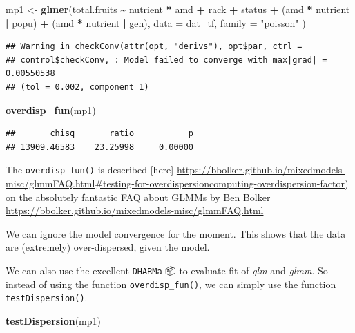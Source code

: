 \documentclass[
  12pt,
]{book}
\newenvironment{Shaded}{\begin{snugshade}}{\end{snugshade}}
\newcommand{\DataTypeTok}[1]{\textcolor[rgb]{0.13,0.29,0.53}{#1}}
\newcommand{\KeywordTok}[1]{\textcolor[rgb]{0.13,0.29,0.53}{\textbf{#1}}}
\newcommand{\NormalTok}[1]{#1}
\newcommand{\OperatorTok}[1]{\textcolor[rgb]{0.81,0.36,0.00}{\textbf{#1}}}
\newcommand{\StringTok}[1]{\textcolor[rgb]{0.31,0.60,0.02}{#1}}
\begin{document}
\begin{Shaded}
\begin{Highlighting}[]
\NormalTok{mp1 \textless{}{-}}\StringTok{ }\KeywordTok{glmer}\NormalTok{(total.fruits }\OperatorTok{\textasciitilde{}}\StringTok{ }\NormalTok{nutrient }\OperatorTok{*}\StringTok{ }\NormalTok{amd }\OperatorTok{+}
\StringTok{  }\NormalTok{rack }\OperatorTok{+}\StringTok{ }\NormalTok{status }\OperatorTok{+}
\StringTok{  }\NormalTok{(amd }\OperatorTok{*}\StringTok{ }\NormalTok{nutrient }\OperatorTok{|}\StringTok{ }\NormalTok{popu) }\OperatorTok{+}
\StringTok{  }\NormalTok{(amd }\OperatorTok{*}\StringTok{ }\NormalTok{nutrient }\OperatorTok{|}\StringTok{ }\NormalTok{gen),}
\DataTypeTok{data =}\NormalTok{ dat\_tf, }\DataTypeTok{family =} \StringTok{"poisson"}
\NormalTok{)}
\end{Highlighting}
\end{Shaded}

\begin{verbatim}
## Warning in checkConv(attr(opt, "derivs"), opt$par, ctrl =
## control$checkConv, : Model failed to converge with max|grad| = 0.00550538
## (tol = 0.002, component 1)
\end{verbatim}

\begin{Shaded}
\begin{Highlighting}[]
\KeywordTok{overdisp\_fun}\NormalTok{(mp1)}
\end{Highlighting}
\end{Shaded}

\begin{verbatim}
##       chisq       ratio           p 
## 13909.46583    23.25998     0.00000
\end{verbatim}

The \texttt{overdisp\_fun()} is described {[}here{]} \url{https://bbolker.github.io/mixedmodels-misc/glmmFAQ.html\#testing-for-overdispersioncomputing-overdispersion-factor}) on the absolutely fantastic FAQ about GLMMs by Ben Bolker \url{https://bbolker.github.io/mixedmodels-misc/glmmFAQ.html}

We can ignore the model convergence for the moment. This shows that the data are (extremely) over-dispersed, given the model.

We can also use the excellent \texttt{DHARMa} 📦 \citep{R-DHARMa} to evaluate fit of \emph{glm} and \emph{glmm}. So instead of using the function \texttt{overdisp\_fun()}, we can simply use the function \texttt{testDispersion()}.

\begin{Shaded}
\begin{Highlighting}[]
\KeywordTok{testDispersion}\NormalTok{(mp1)}
\end{Highlighting}
\end{Shaded}
\end{document}
